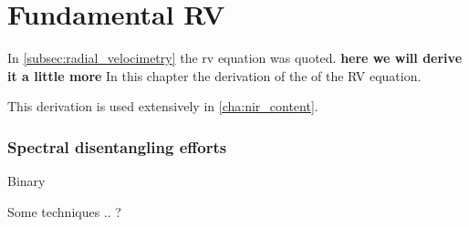 
\chapter{Fundamental RV}
\label{cha:concepts}


In \cref{subsec:radial_velocimetry} the rv equation was quoted. \textbf{here we will derive it a little more}
In this chapter the derivation of the of the RV equation. 








This derivation is used extensively in \cref{cha:nir_content}.



\subsection{Spectral disentangling efforts}

Binary

Some techniques .. ?

